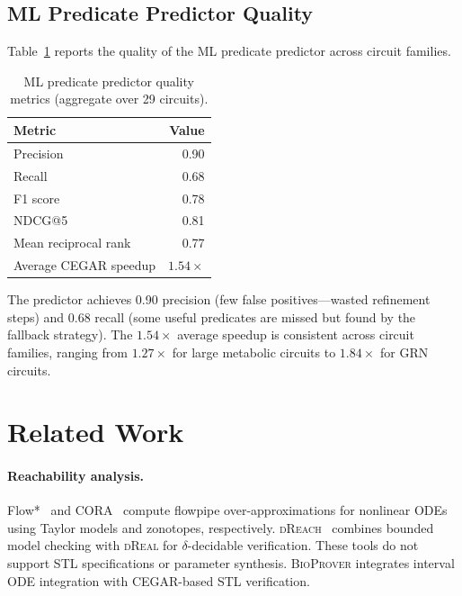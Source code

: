 \documentclass[11pt]{article}
\newcommand{\bioprover}{\textsc{BioProver}}
\newcommand{\cegar}{\textsc{CEGAR}}
\newcommand{\dreach}{\textsc{dReach}}
\newcommand{\dreal}{\textsc{dReal}}
\newcommand{\stl}{\textsc{STL}}
\begin{document}
\subsection{ML Predicate Predictor Quality}

Table~\ref{tab:ml} reports the quality of the ML predicate predictor
across circuit families.

\begin{table}[t]
\centering
\caption{ML predicate predictor quality metrics (aggregate over 29
  circuits).}
\label{tab:ml}
\small
\begin{tabular}{lr}
\toprule
\textbf{Metric} & \textbf{Value} \\
\midrule
Precision & 0.90 \\
Recall & 0.68 \\
F1 score & 0.78 \\
NDCG@5 & 0.81 \\
Mean reciprocal rank & 0.77 \\
Average CEGAR speedup & $1.54\times$ \\
\bottomrule
\end{tabular}
\end{table}

The predictor achieves 0.90 precision (few false positives---wasted
refinement steps) and 0.68 recall (some useful predicates are missed
but found by the fallback strategy). The $1.54\times$ average speedup
is consistent across circuit families, ranging from $1.27\times$ for
large metabolic circuits to $1.84\times$ for GRN circuits.

\section{Related Work}
\label{sec:related}

\paragraph{Reachability analysis.}
Flow*~\cite{chen2013flow} and CORA~\cite{althoff2015cora} compute
flowpipe over-approximations for nonlinear ODEs using Taylor models
and zonotopes, respectively. \dreach{}~\cite{kong2015dreach}
combines bounded model checking with \dreal{} for
$\delta$-decidable verification. These tools do not support \stl{}
specifications or parameter synthesis. \bioprover{} integrates
interval ODE integration with \cegar{}-based \stl{} verification.
\end{document}
